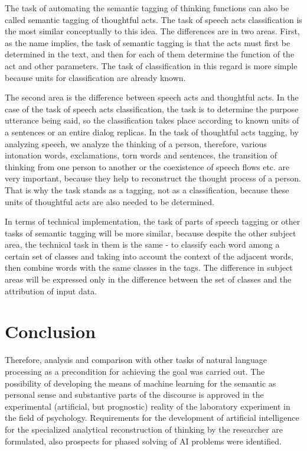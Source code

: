\documentclass[conference]{IEEEtran}
\begin{document}
	The task of automating the semantic tagging of thinking functions can also be called semantic tagging of thoughtful acts. The task of speech acts classification is the most similar conceptually to this idea. The differences are in two areas. First, as the name implies, the task of semantic tagging is that the acts must first be determined in the text, and then for each of them determine the function of the act and other parameters. The task of classification in this regard is more simple because units for classification are already known.
	
	The second area is the difference between speech acts and thoughtful acts. In the case of the task of speech acts classification, the task is to determine the purpose utterance being said, so the classification takes place according to known units of a sentences or an entire dialog replicas. In the task of thoughtful acts tagging, by analyzing speech, we analyze the thinking of a person, therefore, various intonation words, exclamations, torn words and sentences, the transition of thinking from one person to another or the coexistence of speech flows etc. are very important, because they help to reconstruct the thought process of a person. That is why the task stands as a tagging, not as a classification, because these units of thoughtful acts are also needed to be determined.
	
	In terms of technical implementation, the task of parts of speech tagging or other tasks of semantic tagging will be more similar, because despite the other subject area, the technical task in them is the same - to classify each word among a certain set of classes and taking into account the context of the adjacent words, then combine words with the same classes in the tags. The difference in subject areas will be expressed only in the difference between the set of classes and the attribution of input data.
	
	\section{Conclusion}
	
	Therefore, analysis and comparison with other tasks of natural language processing as a precondition for achieving the goal was carried out. The possibility of developing the means of machine learning for the semantic as personal sense and substantive parts of the discourse is approved in the experimental (artificial, but prognostic) reality of the laboratory experiment in the field of psychology. Requirements for the development of artificial intelligence for the specialized analytical reconstruction of thinking by the researcher are formulated, also prospects for phased solving of AI problems were identified.
	
	
	
\end{document}
